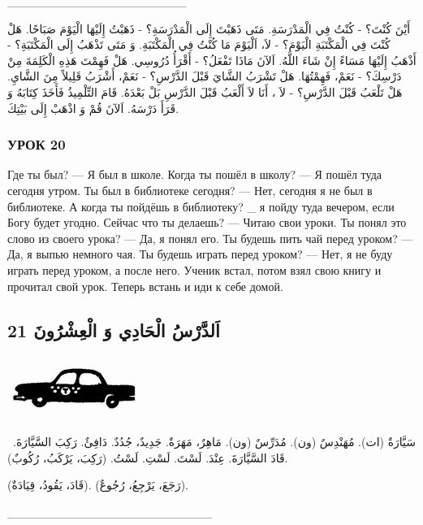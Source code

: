 \documentclass[a5paper]{article}
\begin{document}
\_\_\_\_\_\_\_\_\_\_\_\_\_\_\_\_\_\_\_\_\_

أَيْنَ كُنْتَ؟ - كُنْتُ فِي الْمَدْرَسَةِ. مَتَى ذَهَبْتَ إِلَى الْمَدْرَسَةِ؟ - ذَهَبْتُ إِلَيْهَا الْيَوْمَ صَبَاحًا. هَلْ كُنْتَ فِي الْمَكْتَبَةِ الْيَوْمَ؟ - لاَ، اَلْيَوْمَ مَا كُنْتُ فِي الْمَكْتَبَةِ. وَ مَتَى تَذْهَبُ إِلَى الْمَكْتَبَةِ؟ - أَذْهَبُ إِلَيْهَا مَسَاءً إِنْ شَاءَ اللَّهُ. اَلآنَ مَاذَا تَفْعَلُ؟ - أَقْرَأُ دُرُوسِي. هَلْ فَهِمْتَ هَذِهِ الْكَلِمَةَ مِنْ دَرْسِكَ؟ - نَعَمْ، فَهِمْتُهَا. هَلْ تَشْرَبُ الشَّايَ قَبْلَ الدَّرْسِ؟ - نَعَمْ، أَشْرَبُ قَلِيلاً مِنَ الشَّايِ. هَلْ تَلْعَبُ قَبْلَ الدَّرْسِ؟ - لاَ ، أَنَا لاَ أَلْعَبُ قَبْلَ الدَّرْسِ بَلْ بَعْدَهُ. قَامَ التِّلْمِيذُ فَأَخَذَ كِتَابَهُ وَ قَرَأَ دَرْسَهُ. اَلآنَ قُمْ وَ اذْهَبْ إِلَى بَيْتِكَ.

\subsubsection{УРОК 20}
Где ты был? — Я был в школе. Когда ты пошёл в школу? — Я пошёл туда сегодня утром. Ты был в библиотеке сегодня? — Нет, сегодня я не был в библиотеке. А когда ты пойдёшь в библиоте­ку? \_ я пойду туда вечером, если Богу будет угодно. Сейчас что ты делаешь? — Читаю свои уроки. Ты понял это слово из своего урока? — Да, я понял его. Ты будешь пить чай перед уроком? — Да, я выпью немного чая. Ты будешь играть перед уроком? — Нет, я не буду играть перед уроком, а после него. Ученик встал, потом взял свою книгу и прочитал свой урок. Теперь встань и иди к себе домой.

\subsection{21 اَلدَّرْسُ الْحَادِي وَ الْعِشْرُونَ}
 \includegraphics[width=1.75in,height=0.802in]{images/MuhammadBagauddinprettified-img035.jpg} 

\ سَيَّارَةٌ (ات). مُهَنْدِسٌ (ون). مُدَرِّسٌ (ون). مَاهِرٌ، مَهَرَةٌ. جَدِيدٌ، جُدُدٌ. دَافِئٌ. رَكِبَ السَّيَّارَةَ. قَادَ السَّيَّارَةَ. عِنْدَ. لَسْتَ. لَسْتِ. لَسْتُ. (رَكِبَ، يَرْكَبُ، رُكُوبٌ). 

(قَادَ، يَقُودُ، قِيَادَةٌ). (رَجَعَ، يَرْجِعُ، رُجُوعٌ).

\_\_\_\_\_\_\_\_\_\_\_\_\_\_\_\_\_\_\_\_\_\_\_\_
\end{document}
